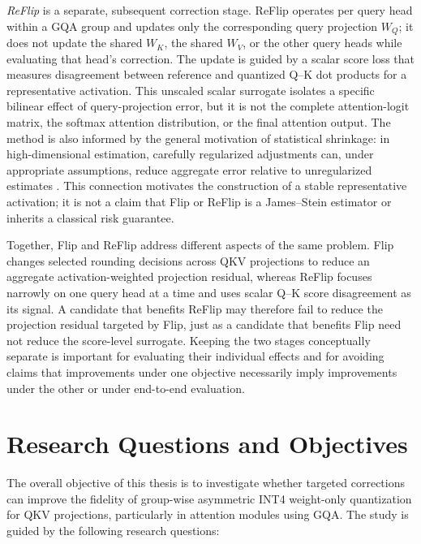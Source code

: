 \emph{ReFlip} is a separate, subsequent correction stage. ReFlip operates per query head within a GQA group and updates only the corresponding query projection \(W_Q\); it does not update the shared \(W_K\), the shared \(W_V\), or the other query heads while evaluating that head's correction. The update is guided by a scalar score loss that measures disagreement between reference and quantized Q--K dot products for a representative activation. This unscaled scalar surrogate isolates a specific bilinear effect of query-projection error, but it is not the complete attention-logit matrix, the softmax attention distribution, or the final attention output. The method is also informed by the general motivation of statistical shrinkage: in high-dimensional estimation, carefully regularized adjustments can, under appropriate assumptions, reduce aggregate error relative to unregularized estimates \cite{james1961estimation}. This connection motivates the construction of a stable representative activation; it is not a claim that Flip or ReFlip is a James--Stein estimator or inherits a classical risk guarantee.

Together, Flip and ReFlip address different aspects of the same problem. Flip changes selected rounding decisions across QKV projections to reduce an aggregate activation-weighted projection residual, whereas ReFlip focuses narrowly on one query head at a time and uses scalar Q--K score disagreement as its signal. A candidate that benefits ReFlip may therefore fail to reduce the projection residual targeted by Flip, just as a candidate that benefits Flip need not reduce the score-level surrogate. Keeping the two stages conceptually separate is important for evaluating their individual effects and for avoiding claims that improvements under one objective necessarily imply improvements under the other or under end-to-end evaluation.

\section{Research Questions and Objectives}

The overall objective of this thesis is to investigate whether targeted corrections can improve the fidelity of group-wise asymmetric INT4 weight-only quantization for QKV projections, particularly in attention modules using GQA. The study is guided by the following research questions:


